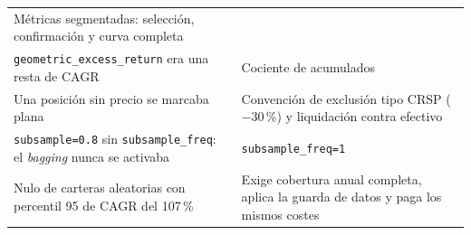 \begin{longtable}{@{}>{\raggedright\arraybackslash}p{7.7cm}>{\raggedright\arraybackslash}p{7.7cm}@{}}
Métricas segmentadas: selección, confirmación y curva completa \\
\addlinespace
\texttt{geometric\_excess\_return} era una resta de CAGR &
Cociente de acumulados \\
\addlinespace
Una posición sin precio se marcaba plana &
Convención de exclusión tipo CRSP ($-30$\,\%) y liquidación contra efectivo \\
\addlinespace
\texttt{subsample=0.8} sin \texttt{subsample\_freq}: el \textit{bagging} nunca se activaba &
\texttt{subsample\_freq=1} \\
\addlinespace
Nulo de carteras aleatorias con percentil 95 de CAGR del 107\,\% &
Exige cobertura anual completa, aplica la guarda de datos y paga los mismos costes \\
\end{longtable}
